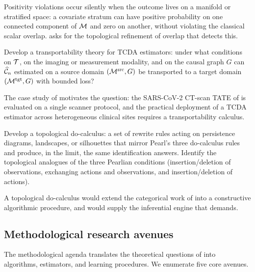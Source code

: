 Positivity violations occur silently when the outcome lives on a
manifold or stratified space: a covariate stratum can have positive
probability on one connected component of $\mathcal{M}$ and zero on another,
without violating the classical scalar overlap.
 asks for the topological refinement
of overlap that detects this.

\begin{question}
\label{q:transportability}
Develop a transportability theory \citep{pearl2014external,
bareinboim2020pearls} for TCDA estimators: under what conditions on
$\mathcal{T}$, on the imaging or measurement modality, and on the causal
graph $G$ can $\widehat{\mathcal{C}}_n$ estimated on a source domain
$(\mathcal{M}^{\mathrm{src}}, G)$ be transported to a target domain
$(\mathcal{M}^{\mathrm{tgt}}, G)$ with bounded loss?
\end{question}

The case study of  motivates the question: the
SARS-CoV-2 CT-scan TATE of \citet{kim2026topological} is evaluated on
a single scanner protocol, and the practical deployment of a TCDA
estimator across heterogeneous clinical sites requires a
transportability calculus.

\begin{question}\label{q:topo-docalculus}
Develop a topological do-calculus: a set of rewrite rules acting on
persistence diagrams, landscapes, or silhouettes that mirror Pearl's
three do-calculus rules and produce, in the limit, the same
identification answers. Identify the topological analogues of the
three Pearlian conditions (insertion/deletion of observations,
exchanging actions and observations, and insertion/deletion of
actions).
\end{question}

A topological do-calculus would extend the categorical work of
\citet{mahadevan2025sheaf} into a constructive algorithmic procedure,
and would supply the inferential engine that
 demands.

\subsection{Methodological research avenues}\label{sec:research_method}

The methodological agenda translates the theoretical questions of
 into algorithms, estimators, and learning
procedures. We enumerate five core avenues.


